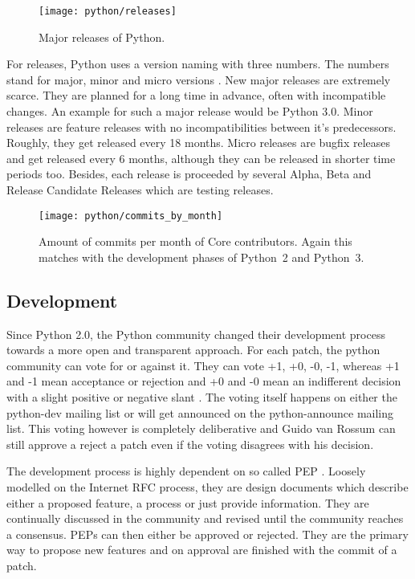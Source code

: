 \begin{figure}[htbp]
  \centering
  \texttt{[image: python/releases]}
  \caption{Major releases of Python.}
\end{figure}

For releases, Python uses a version naming with three numbers. The numbers
stand for major, minor and micro versions
\cite{PythonDevelopmentCycle,Warsaw2001}. New major releases are extremely
scarce. They are planned for a long time in advance, often with incompatible
changes. An example for such a major release would be Python 3.0. Minor
releases are feature releases with no incompatibilities between it's
predecessors. Roughly, they get released every 18 months. Micro releases are
bugfix releases and get released every 6 months, although they can be released
in shorter time periods too. Besides, each release is proceeded by several
Alpha, Beta and Release Candidate Releases which are testing releases.

\begin{figure}[htbp]
  \centering
  \texttt{[image: python/commits\_by\_month]}
  \caption{Amount of commits per month of Core contributors. Again this matches
  with the development phases of Python~2 and Python~3.}
\end{figure}


\subsection{Development} %

Since Python 2.0, the Python community changed their development process
towards a more open and transparent approach. For each patch, the python
community can vote for or against it. They can vote +1, +0, -0, -1, whereas +1
and -1 mean acceptance or rejection and +0 and -0 mean an indifferent decision
with a slight positive or negative slant \cite{Warsaw2002}. The voting itself
happens on either the python-dev mailing list or will get announced on the
python-announce mailing list. This voting however is completely deliberative
and Guido van Rossum can still approve a reject a patch even if the voting
disagrees with his decision.

The development process is highly dependent on so called \ac{PEP}
\cite{Warsaw2000}. Loosely modelled on the Internet RFC process, they are
design documents which describe either a proposed feature, a process or just
provide information. They are continually discussed in the community and
revised until the community reaches a consensus. \acp{PEP} can then either be
approved or rejected. They are the primary way to propose new features and on
approval are finished with the commit of a patch.

